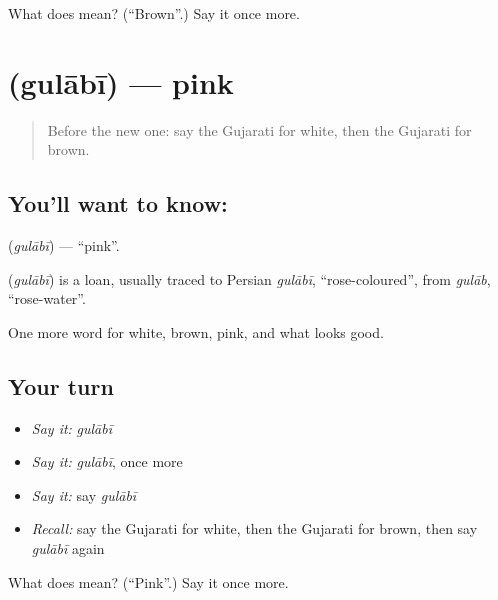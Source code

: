 \begin{tcolorbox}[breakable,colback=teal!4,colframe=teal!35!black,title={Before you move on}]
What does  mean? (\textquotedblleft{}Brown\textquotedblright{}.) Say it once more.
\end{tcolorbox}
\section[\texorpdfstring{\gu{ગુલાબી} (gulābī)}{ગુલાબી (gulābī)}]{ (gulābī) — pink}

\label{lesson:GU-C71-pink}



\begin{quote}
Before the new one: say the Gujarati for white, then the Gujarati for brown.
\end{quote}

\subsection*{You'll want to know: }
\textbf{} (\emph{gulābī}) — \textquotedblleft{}pink\textquotedblright{}.

\begin{cousinweb}
\textbf{} (\emph{gulābī}) is a loan, usually traced to Persian \emph{gulābī}, \textquotedblleft{}rose-coloured\textquotedblright{}, from \emph{gulāb}, \textquotedblleft{}rose-water\textquotedblright{}.
\end{cousinweb}

\begin{grammarlens}[title={What you've built}]
One more word for white, brown, pink, and what looks good.
\end{grammarlens}

\subsection*{Your turn}
\begin{itemize}
\raggedright
  \item \emph{Say it:} \emph{gulābī}
  \item \emph{Say it:} \emph{gulābī}, once more
  \item \emph{Say it:} say \emph{gulābī}
  \item \emph{Recall:} say the Gujarati for white, then the Gujarati for brown, then say \emph{gulābī} again
\end{itemize}

\begin{tcolorbox}[breakable,colback=teal!4,colframe=teal!35!black,title={Before you move on}]
What does  mean? (\textquotedblleft{}Pink\textquotedblright{}.) Say it once more.
\end{tcolorbox}
